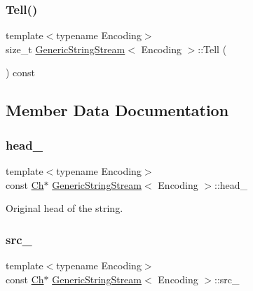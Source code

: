 \mbox{\label{structGenericStringStream_abc73d04baf4c7c58f383bc52536e8ac4}} 
\subsubsection{\texorpdfstring{Tell()}{Tell()}}
{\footnotesize\ttfamily template$<$typename Encoding$>$ \\
size\+\_\+t \hyperlink{structGenericStringStream}{Generic\+String\+Stream}$<$ Encoding $>$\+::Tell (\begin{DoxyParamCaption}{ }\end{DoxyParamCaption}) const\hspace{0.3cm}{\ttfamily [inline]}}



\subsection{Member Data Documentation}
\mbox{\label{structGenericStringStream_a3c86ef1e1f0655028cb8a3afce11ee4f}} 
\subsubsection{\texorpdfstring{head\+\_\+}{head\_}}
{\footnotesize\ttfamily template$<$typename Encoding$>$ \\
const \hyperlink{structGenericStringStream_a4289aca895330084ff3168e37e4f08bd}{Ch}$\ast$ \hyperlink{structGenericStringStream}{Generic\+String\+Stream}$<$ Encoding $>$\+::head\+\_\+}



Original head of the string. 

\mbox{\label{structGenericStringStream_aeda813798e3f2d6bfdac86afc11b6b80}} 
\subsubsection{\texorpdfstring{src\+\_\+}{src\_}}
{\footnotesize\ttfamily template$<$typename Encoding$>$ \\
const \hyperlink{structGenericStringStream_a4289aca895330084ff3168e37e4f08bd}{Ch}$\ast$ \hyperlink{structGenericStringStream}{Generic\+String\+Stream}$<$ Encoding $>$\+::src\+\_\+}



